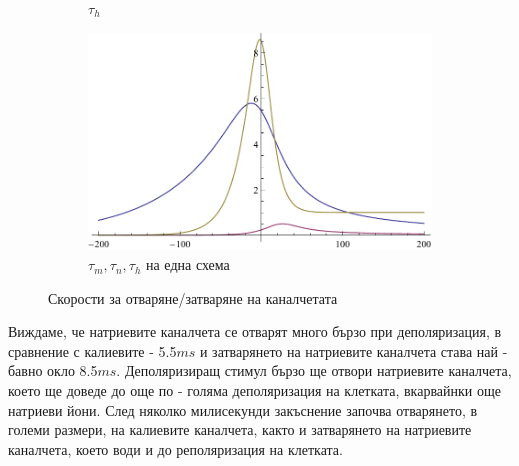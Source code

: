 \documentclass{article}
\numberwithin{equation}{section}
\begin{document}
\begin{figure}[H]
\begin{subfigure}[t]{0.3\textwidth}
            \caption{$\tau_h$}
        \end{subfigure}
        \begin{subfigure}[t]{0.3\textwidth}
            \includegraphics[width=\textwidth]{./schemas/tcomb.pdf}
            \caption{$ \tau_m, \tau_n, \tau_h$ на една схема}
        \end{subfigure}
        \caption{Скорости за отваряне/затваряне на каналчетата}\label{fig:chanel_prob}
    \end{figure}
    Виждаме, че натриевите каналчета се отварят много бързо при деполяризация, в сравнение с калиевите - 5.5$ms$ и затварянето на
    натриевите каналчета става най - бавно окло 8.5$ms$. Деполяризиращ стимул бързо ще отвори натриевите каналчета, което ще доведе до още
    по - голяма деполяризация на клетката, вкарвайнки още натриеви йони. След няколко милисекунди закъснение започва отварянето, в големи
    размери, на калиевите каналчета, както и затварянето на натриевите каналчета, което води и до реполяризация на клетката.
    
\end{document}

